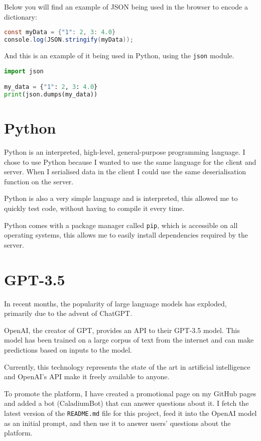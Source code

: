 Below you will find an example of JSON being used in the browser to encode a dictionary:

\begin{lstlisting}[language=Java]
const myData = {"1": 2, 3: 4.0}
console.log(JSON.stringify(myData));
\end{lstlisting}

And this is an example of it being used in Python, using the \texttt{json} module.

\begin{lstlisting}[language=Python]
import json

my_data = {"1": 2, 3: 4.0}
print(json.dumps(my_data))
\end{lstlisting}

\section{Python}
Python is an interpreted, high-level, general-purpose programming language.
I chose to use Python because I wanted to use the same language for the client and server.
When I serialised data in the client I could use the same
deserialisation function on the server.

Python is also a very simple language and is interpreted,
this allowed me to quickly test code, without having to compile it every time.

Python comes with a package manager called \texttt{pip},
which is accessible on all operating systems,
this allows me to easily install dependencies required by the server.

\section{GPT-3.5}
In recent months, the popularity of large language models has exploded,
primarily due to the advent of ChatGPT.

OpenAI, the creator of GPT, provides an API to their GPT-3.5 model.
This model has been trained on a large corpus of text from the internet
and can make predictions based on inputs to the model.

Currently, this technology represents the state of the art in
artificial intelligence and OpenAI's API make it freely available to anyone.

To promote the platform, I have created a promotional page on
my GitHub pages and added a bot (CaladiumBot) that can answer questions about it.
I fetch the latest version of the \texttt{README.md} file for
this project, feed it into the OpenAI model as an initial prompt,
and then use it to answer users' questions about the platform.

